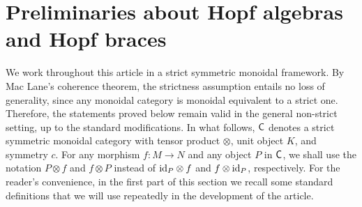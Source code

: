 \documentclass[11pt,reqno]{amsart}
\theoremstyle{plain}%
\theoremstyle{definition}
\theoremstyle{remark}
\begin{document}
\section{Preliminaries about Hopf algebras and Hopf braces}
We work throughout this article in a strict symmetric monoidal framework. By Mac Lane's coherence theorem, the strictness assumption entails no loss of generality, since any monoidal category is monoidal equivalent to a strict one. Therefore, the statements proved below remain valid in the general non-strict setting, up to the standard modifications. In what follows, ${\sf C}$ denotes a strict symmetric monoidal category with tensor product $\otimes$, unit object $K$, and symmetry $c$. For any morphism $f\colon M\rightarrow N$ and any object $P$ in ${\sf C}$, we shall use the notation $P\otimes f$ and $f\otimes P$ instead of ${\rm id}_{P}\otimes f$ and $f\otimes{\rm id}_{P}$, respectively. For the reader's convenience, in the first part of this section we recall some standard definitions that we will use repeatedly in the development of the article.
\end{document}
